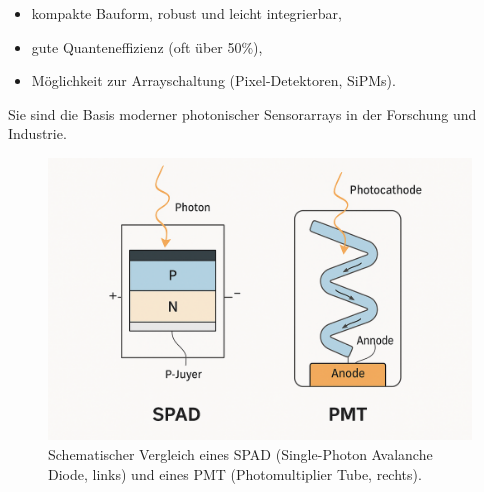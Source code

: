 \begin{itemize}
	\item kompakte Bauform, robust und leicht integrierbar,
	\item gute Quanteneffizienz (oft über 50\%),
	\item Möglichkeit zur Arrayschaltung (Pixel-Detektoren, SiPMs).
\end{itemize}

Sie sind die Basis moderner photonischer Sensorarrays in der Forschung und Industrie.
\begin{figure}[H]
	\centering
	\includegraphics[width=0.9\linewidth]{bilder/SPAD-PMT.png}
	\caption{Schematischer Vergleich eines SPAD (Single-Photon Avalanche Diode, links) und eines PMT (Photomultiplier Tube, rechts). }
	\label{fig:spad_pmt}
\end{figure}
